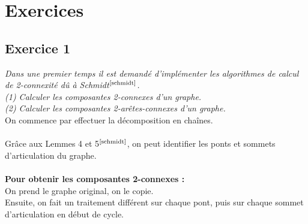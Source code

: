\documentclass{article}      %
\begin{document}
\section{Exercices}
\subsection{Exercice 1}
\textit{\textcolor{exogris}{
Dans une premier temps il est demandé d’implémenter les algorithmes de calcul de 2-connexité dû à Schmidt$^\text{\cite{schmidt}}$.
\\(1) Calculer les composantes 2-connexes d’un graphe.
\\(2) Calculer les composantes 2-arêtes-connexes d’un graphe.
}}
\\On commence par effectuer la décomposition en chaînes.
\\\\Grâce aux Lemmes 4 et 5$^\text{\cite{schmidt}}$, on peut identifier les ponts et sommets d'articulation du graphe.
\\\\\textbf{Pour obtenir les composantes 2-connexes :}
\\On prend le graphe original, on le copie.
\\Ensuite, on fait un traitement différent sur chaque pont, puis sur chaque sommet d'articulation en début de cycle.
\end{document}
